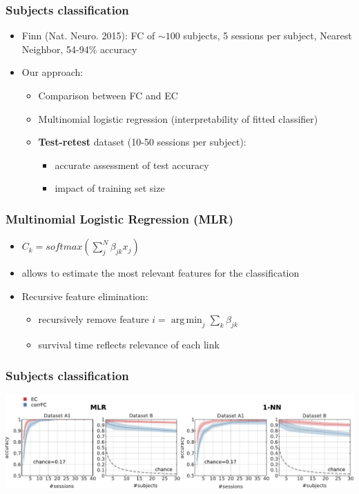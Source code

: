 \documentclass[final]{beamer}
\begin{document}
\begin{frame}
\transdissolve
\frametitle{Subjects classification}
\begin{itemize}
		\pause
	\item Finn (Nat. Neuro. 2015): FC of $\sim100$ subjects, 5 sessions per subject, Nearest Neighbor, 54-94\% accuracy   
		\pause
	\item Our approach:
		\pause
		\begin{itemize}
	\item Comparison between FC and EC
		\pause
	\item Multinomial logistic regression (interpretability of fitted classifier)
		\pause
	\item \textbf{Test-retest} dataset (10-50 sessions per subject): 
		\pause
		\begin{itemize}
			\item accurate assessment of test accuracy 
		\pause
			\item impact of training set size
		\end{itemize}
		\end{itemize}
\end{itemize}
\end{frame}

\begin{frame}
\transdissolve
\frametitle{Multinomial Logistic Regression (MLR)}
\begin{itemize}
	\item $C_k = softmax(\sum_j^N \beta_{jk} x_j)$
\pause
\item allows to estimate the most relevant features for the classification
	\item Recursive feature elimination: 
		\begin{itemize}
			\item recursively remove feature $i = \operatorname*{arg\,min}_j \sum_k \beta_{jk}$
			\item survival time reflects relevance of each link
		\end{itemize}
\end{itemize}
\end{frame}

\begin{frame}
\frametitle{Subjects classification}
\begin{center}
\includegraphics[width=0.95\columnwidth]{class_subj}
\end{center}
\end{frame}
\end{document}
